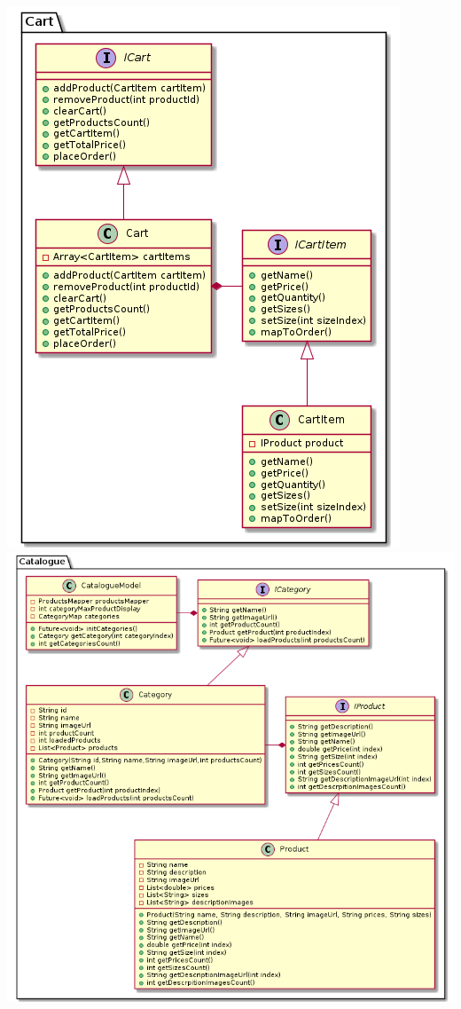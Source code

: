 \documentclass{article}
\begin{document}
\includegraphics[scale=0.5]{./out/MobileApp/Domain/Cart/Cart.png}\\
\includegraphics[scale=0.5]{./out/MobileApp/Domain/Catalogue/Catalogue.png}
\end{document}
